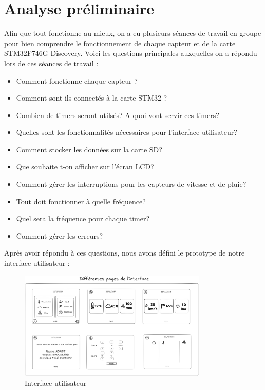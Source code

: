 \documentclass[12pt]{article}
\begin{document}
\section{Analyse préliminaire}
Afin que tout fonctionne au mieux, on a eu plusieurs séances de travail en groupe pour bien comprendre le fonctionnement de chaque capteur et de la carte STM32F746G Discovery.
Voici les questions principales auxquelles on a répondu lors de ces séances de travail :
\begin{itemize}
    \item Comment fonctionne chaque capteur ?
    \item Comment sont-ils connectés à la carte STM32 ?
    \item Combien de timers seront utilsés? A quoi vont servir ces timers?
    \item Quelles sont les fonctionnalités nécessaires pour l'interface utilisateur?
    \item Comment stocker les données sur la carte SD?
    \item Que souhaite t-on afficher sur l'écran LCD?
    \item Comment gérer les interruptions pour les capteurs de vitesse et de pluie?
    \item Tout doit fonctionner à quelle fréquence?
    \item Quel sera la fréquence pour chaque timer?
    \item Comment gérer les erreurs?
\end{itemize}

Après avoir répondu à ces questions, nous avons défini le prototype de notre interface utilisateur :

\begin{figure}[H]
    \capstart
    \centering
    \includegraphics[width=0.8\textwidth]{./images/prototype_interface.png}
    \caption{Interface utilisateur}
    \label{fig:interface}
\end{figure}
\end{document}
